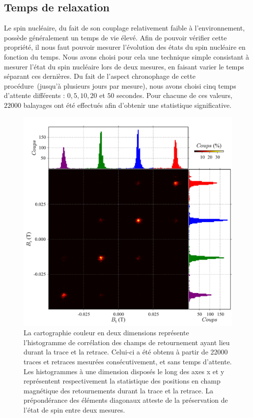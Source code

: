 \subsection{Temps de relaxation}
Le spin nucléaire, du fait de son couplage relativement faible à l’environnement, possède généralement un temps de vie élevé. Afin de pouvoir vérifier cette propriété, il nous faut pouvoir mesurer l'évolution des états du spin nucléaire en fonction du temps. Nous avons choisi pour cela une technique simple consistant à mesurer l'état du spin nucléaire lors de deux mesures, en faisant varier le temps séparant ces dernières. Du fait de l'aspect chronophage de cette procédure~(jusqu'à plusieurs jours par mesure), nous avons choisi cinq temps d'attente différents : $0,5,10,20$ et $50$ secondes. Pour chacune de ces valeurs, $22000$ balayages ont été effectués afin d'obtenir une statistique significative.


\begin{figure}
\includegraphics[scale=0.45]{Resultats/Hist2D/Hist2D.pdf} 
\caption{La cartographie couleur en deux dimensions représente l’histogramme de corrélation des champs de retournement ayant lieu durant la trace et la retrace. Celui-ci a été obtenu à partir de 22000 traces et retraces mesurées consécutivement, et sans temps d'attente. Les histogrammes à une dimension disposés le long des axes x et y représentent respectivement la statistique des positions en champ magnétique des retournements durant la trace et la retrace. La prépondérance des éléments diagonaux atteste de la préservation de l'état de spin entre deux mesures.}
\label{correlations}
\end{figure}


